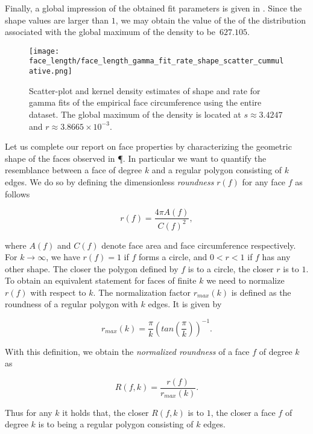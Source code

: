 		Finally, a global impression of the obtained fit parameters is given in . Since the shape values are larger than $1$, we may obtain the value of the of the distribution associated with the global maximum of the density to be~$627.105$.

		\begin{figure}[!htbp]
			\centering
				\texttt{[image: face\_length/face\_length\_gamma\_fit\_rate\_shape\_scatter\_cummulative.png]}
			\caption[Face circumference fit parameter densities.]{Scatter-plot and kernel density estimates of shape and rate for gamma fits of the empirical face circumference using the entire dataset. The global maximum of the density is located at $s \approx 3.4247$ and $r \approx 3.8665 \times 10^{-3}$.}
			\label{fig:face_length_kde}
		\end{figure}

		Let us complete our report on face properties by characterizing the geometric shape of the faces observed in \P. In particular we want to quantify the resemblance between a face of degree $k$ and a regular polygon consisting of $k$ edges. We do so by defining the dimensionless \emph{roundness} $r(f)$ for any face $f$ as follows

		\begin{equation}
			 r(f) = \frac{4 \pi A(f)}{C(f)^2},
		\end{equation}

		where $A(f)$ and $C(f)$ denote face area and face circumference respectively. For $k \to \infty$, we have $r(f) = 1$ if $f$ forms a circle, and $0 < r < 1$ if $f$ has any other shape. The closer the polygon defined by $f$ is to a circle, the closer $r$ is to $1$. To obtain an equivalent statement for faces of finite $k$ we need to normalize $r(f)$ with respect to $k$. The normalization factor $r_{max}(k)$ is defined as the roundness of a regular polygon with $k$ edges. It is given by

		\begin{equation}
			r_{max}(k) = \frac{\pi}{k} (tan(\frac{\pi}{k}))^{-1}.
		\end{equation}

		With this definition, we obtain the \emph{normalized roundness} of a face $f$ of degree $k$ as

		\begin{equation}
			R(f,k) = \frac{r(f)}{r_{max}(k)}.
		\end{equation}

		Thus for any $k$ it holds that, the closer $R(f,k)$ is to $1$, the closer a face $f$ of degree $k$ is to being a regular polygon consisting of $k$ edges. 

